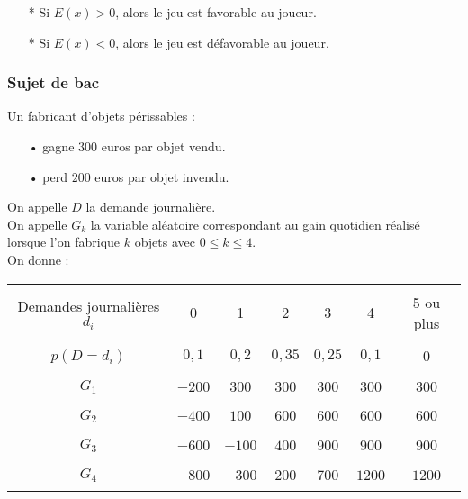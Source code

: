 \begin{itemize}
\item[*] Si $E(x) > 0$, alors le jeu est favorable au joueur.  
\item[*] Si $E(x) < 0$, alors le jeu est défavorable au joueur. 
\end{itemize} 

\newpage

\subsubsection{Sujet de bac}

Un fabricant d'objets périssables : \\

\begin{itemize}
\item[•] gagne $300$ euros par objet vendu.
\item[•] perd $200$ euros par objet invendu. 
\end{itemize}

\vspace*{.3cm}

On appelle $D$ la demande journalière. \\
On appelle $G_k$ la variable aléatoire correspondant au gain quotidien réalisé lorsque l'on fabrique $k$ objets avec $0 \leqslant k \leqslant 4$. \\

On donne : \\

\begin{tabular}{|c|c|c|c|c|c|c|}
\hline
& & & & & & \\
Demandes journalières $d_i$ & 0 & 1 & 2 & 3 & 4 & 5 ou plus \\
& & & & & & \\
\hline
& & & & & & \\
$p\left(D = d_i\right)$ & $0,1$ & $0,2$ & $0,35$ & $0,25$ & $0,1$ & $0$ \\
& & & & & & \\
\hline
& & & & & & \\
$G_1$ & $-200$ & $300$ & $300$ & $300$ & $300$ & $300$ \\
& & & & & & \\
\hline
& & & & & & \\
$G_2$ & $-400$ & $100$ & $600$ & $600$ & $600$ & $600$ \\
& & & & & & \\
\hline
& & & & & & \\
$G_3$ & $-600$ & $-100$ & $400$ & $900$ & $900$ & $900$ \\
& & & & & & \\
\hline
& & & & & & \\
$G_4$ & $-800$ & $-300$ & $200$ & $700$ & $1200$ & $1200$ \\
& & & & & & \\
\hline
\end{tabular}

